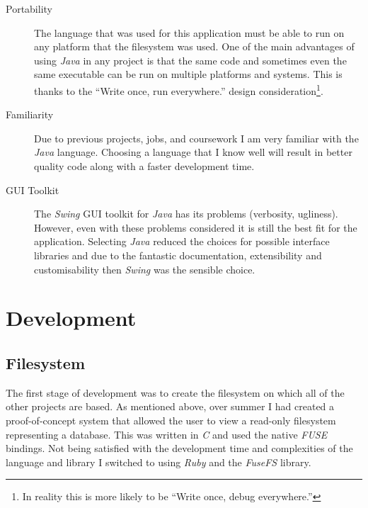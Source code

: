 \begin{description}
  \item[Portability] \hfill

    The language that was used for this application must be able to run on any
    platform that the filesystem was used. One of the main advantages of using
    \emph{Java} in any project is that the same code and sometimes even the
    same executable can be run on multiple platforms and systems. This is
    thanks to the ``Write once, run everywhere.'' design
    consideration\footnote{In reality this is more likely to be ``Write once,
    debug everywhere.''}.

  \item[Familiarity] \hfill

    Due to previous projects, jobs, and coursework I am very familiar with the
    \emph{Java} language. Choosing a language that I know well will result in
    better quality code along with a faster development time.

  \item[GUI Toolkit] \hfill

    The \emph{Swing} GUI toolkit for \emph{Java} has its problems (verbosity,
    ugliness). However, even with these problems considered it is still the
    best fit for the application. Selecting \emph{Java} reduced the choices for
    possible interface libraries and due to the fantastic documentation,
    extensibility and customisability then \emph{Swing} was the sensible
    choice.

\end{description}

\section{Development}

\subsection{Filesystem}

The first stage of development was to create the filesystem on which all of the
other projects are based. As mentioned above, over summer I had created
a proof-of-concept system that allowed the user to view a read-only filesystem
representing a database. This was written in \emph{C} and used the native
\emph{FUSE} bindings. Not being satisfied with the development time and
complexities of the language and library I switched to using \emph{Ruby} and
the \emph{FuseFS} library.

